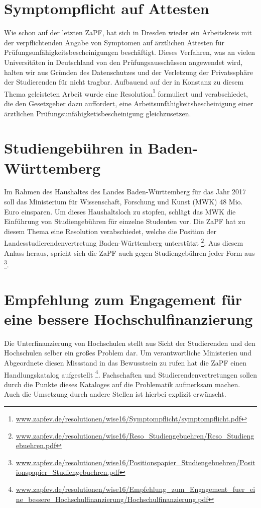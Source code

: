 \section*{Symptompflicht auf Attesten}
Wie schon auf der letzten ZaPF, hat sich in Dresden wieder ein Arbeitskreis mit der verpflichtenden Angabe von Symptomen auf ärztlichen Attesten für 
Prüfungsunfähigkeitsbescheinigungen beschäftigt. Dieses Verfahren, was an vielen Universitäten in Deutschland von den Prüfungsausschüssen angewendet wird, 
halten wir aus Gründen des Datenschutzes und der Verletzung der Privatssphäre der Studierenden für nicht tragbar. Aufbauend auf der in Konstanz zu diesem 
Thema geleisteten Arbeit wurde eine Resolution\footnote{\href{https://zapfev.de/resolutionen/wise16/Symptompflicht/symptompflicht.pdf}{\url{www.zapfev.de/resolutionen/wise16/Symptompflicht/symptompflicht.pdf}}} 
formuliert und verabschiedet, die den Gesetzgeber dazu auffordert, eine Arbeitsunfähigkeitsbescheinigung einer ärztlichen Prüfungsunfähigketisbescheinigung gleichzusetzen.

\section*{Studiengebühren in Baden-Württemberg}
Im Rahmen des Haushaltes des Landes Baden-Württemberg für das Jahr 2017 soll das Ministerium für Wissenschaft, Forschung und Kunst (MWK) 48 Mio. Euro einsparen. 
Um dieses Haushaltsloch zu stopfen, schlägt das MWK die Einführung von Studiengebühren für einzelne Studenten vor. Die ZaPF hat zu diesem Thema eine Resolution verabschiedet, 
welche die Position der Landesstudierendenvertretung Baden-Württemberg unterstützt 
\footnote{\href{https://zapfev.de/resolutionen/wise16/Reso_Studiengebuehren/Reso_Studiengebuehren.pdf}{\url{www.zapfev.de/resolutionen/wise16/Reso_Studiengebuehren/Reso_Studiengebuehren.pdf}}}. 
Aus diesem Anlass heraus, spricht sich die ZaPF auch gegen Studiengebühren jeder Form aus
\footnote{\href{https://zapfev.de/resolutionen/wise16/Positionspapier_Studiengebuehren/Positionspapier_Studiengebuehren.pdf}{\url{www.zapfev.de/resolutionen/wise16/Positionspapier_Studiengebuehren/Positionspapier_Studiengebuehren.pdf}}}.

\section*{Empfehlung zum Engagement für eine bessere Hochschulfinanzierung}
Die Unterfinanzierung von Hochschulen stellt aus Sicht der Studierenden und den Hochschulen selber ein großes Problem dar. Um verantwortliche Ministerien und Abgeordnete 
diesen Missstand in das Bewusstsein zu rufen hat die ZaPF einen Handlungskatalog aufgestellt
\footnote{\href{https://zapfev.de/resolutionen/wise16/Empfehlung_zum_Engagement_fuer_eine_bessere_Hochschulfinanzierung/Hochschulfinanzierung.pdf}{\url{www.zapfev.de/resolutionen/wise16/Empfehlung_zum_Engagement_fuer_eine_bessere_Hochschulfinanzierung/Hochschulfinanzierung.pdf}}}. 
Fachschaften und Studierendenvertretungen sollen durch die Punkte dieses Kataloges auf die Problematik aufmerksam machen. Auch die Umsetzung durch andere Stellen ist 
hierbei explizit erwünscht.

